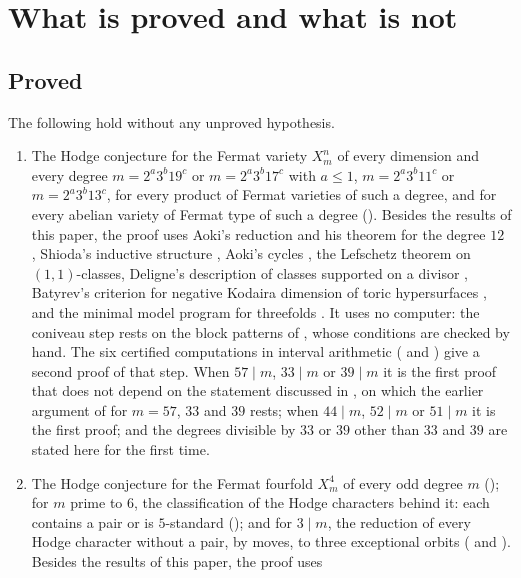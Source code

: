 \section{What is proved and what is not}\label{sec:end}

\subsection*{Proved}
The following hold without any unproved hypothesis.
\begin{enumerate}[label=\textup{(\arabic*)}]
\item The Hodge conjecture for the Fermat variety $X^{n}_{m}$ of every
dimension and every degree $m=2^{a}3^{b}19^{c}$ or $m=2^{a}3^{b}17^{c}$ with
$a\le1$, $m=2^{a}3^{b}11^{c}$ or $m=2^{a}3^{b}13^{c}$, for every product of
Fermat varieties of such a degree, and for every abelian variety of Fermat
type of such a degree (). Besides the results of this
paper, the proof uses Aoki's reduction and his theorem for the degree $12$
\cite{Aok83,Aok00}, Shioda's inductive structure \cite{Shi79}, Aoki's cycles
\cite{Aok87}, the Lefschetz theorem on $(1,1)$-classes, Deligne's
description of classes supported on a divisor \cite{Del74}, Batyrev's
criterion for negative Kodaira dimension of toric hypersurfaces
\cite{Bat24}, and the minimal model program for threefolds
\cite{Mor88,Miy88,MM86}. It uses no computer: the coniveau step rests on the
block patterns of , whose conditions are checked by hand.
The six certified computations in interval arithmetic
(
and ) give a second proof of that step. When $57\mid m$,
$33\mid m$ or $39\mid m$ it is the first proof that does not depend on the
statement discussed in , on which the earlier argument of
\cite{MMRV26} for $m=57$, $33$ and $39$ rests; when $44\mid m$, $52\mid m$
or $51\mid m$ it is the first proof; and the degrees divisible by $33$ or
$39$ other than $33$ and $39$ are stated here for the first time.
\item The Hodge conjecture for the Fermat fourfold $X^{4}_{m}$ of every odd
degree $m$ (); for $m$ prime to $6$, the classification of the
Hodge characters behind it: each contains a pair or is $5$-standard
(); and for $3\mid m$, the reduction of every Hodge
character without a pair, by moves, to three exceptional orbits
( and ). Besides the results of this paper, the proof uses

\end{enumerate}
